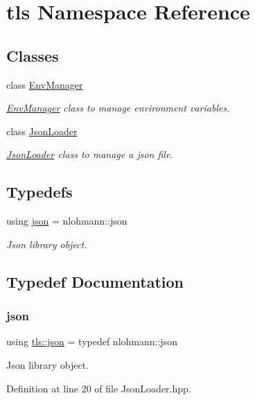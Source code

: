 \hypertarget{namespacetls}{}\section{tls Namespace Reference}
\label{namespacetls}
\subsection*{Classes}
\begin{DoxyCompactItemize}
\item 
class \hyperlink{classtls_1_1_env_manager}{Env\+Manager}
\begin{DoxyCompactList}\small\item\em \hyperlink{classtls_1_1_env_manager}{Env\+Manager} class to manage environment variables. \end{DoxyCompactList}\item 
class \hyperlink{classtls_1_1_json_loader}{Json\+Loader}
\begin{DoxyCompactList}\small\item\em \hyperlink{classtls_1_1_json_loader}{Json\+Loader} class to manage a json file. \end{DoxyCompactList}\end{DoxyCompactItemize}
\subsection*{Typedefs}
\begin{DoxyCompactItemize}
\item 
using \hyperlink{namespacetls_a4e8d32383e204ee25990db65651ea712}{json} = nlohmann\+::json
\begin{DoxyCompactList}\small\item\em Json library object. \end{DoxyCompactList}\end{DoxyCompactItemize}


\subsection{Typedef Documentation}
\mbox{\label{namespacetls_a4e8d32383e204ee25990db65651ea712}} 
\subsubsection{\texorpdfstring{json}{json}}
{\footnotesize\ttfamily using \hyperlink{namespacetls_a4e8d32383e204ee25990db65651ea712}{tls\+::json} = typedef nlohmann\+::json}



Json library object. 



Definition at line 20 of file Json\+Loader.\+hpp.

